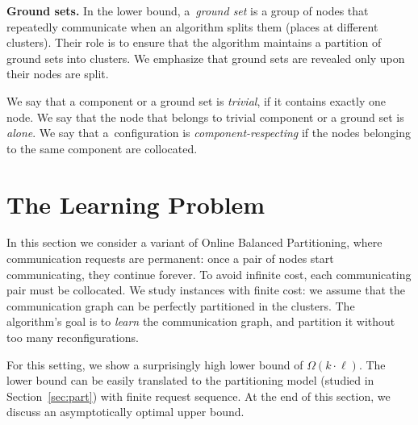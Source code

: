 \documentclass[manuscript,screen=true, review, anonymous]{acmart}
\newcommand\maciek[1]{\color{brown}\textbf{(Maciek: #1)}\color{black}}
\begin{document}
\noindent
\textbf{Ground sets.}
In the lower bound, a~\emph{ground set} is a group of nodes that repeatedly communicate when an algorithm splits them (places at different clusters).
Their role is to ensure that the algorithm maintains a partition of ground sets into clusters.
We emphasize that ground sets are revealed only upon their nodes are split.


We say that a component or a ground set is \emph{trivial}, if it contains exactly one node.
We say that the node that belongs to trivial component or a ground set is \emph{alone}.
We say that a~configuration is \emph{component-respecting}
if the nodes belonging to the same component are collocated.



\section{The Learning Problem} %

In this section we consider a variant of Online Balanced Partitioning, where communication requests are permanent: once a pair of nodes start communicating, they continue forever.
To avoid infinite cost, each communicating pair must be collocated.
We study instances with finite cost: we assume that the communication graph can be perfectly partitioned in the clusters.
The algorithm's goal is to \emph{learn} the communication graph, and partition it without too many reconfigurations.


For this setting, we show a surprisingly high lower bound of $\Omega(k \cdot \ell)$.
The lower bound can be easily translated to the partitioning model (studied in Section~\ref{sec:part}) with finite request sequence.
At the end of this section, we discuss an asymptotically optimal upper bound.
\end{document}
